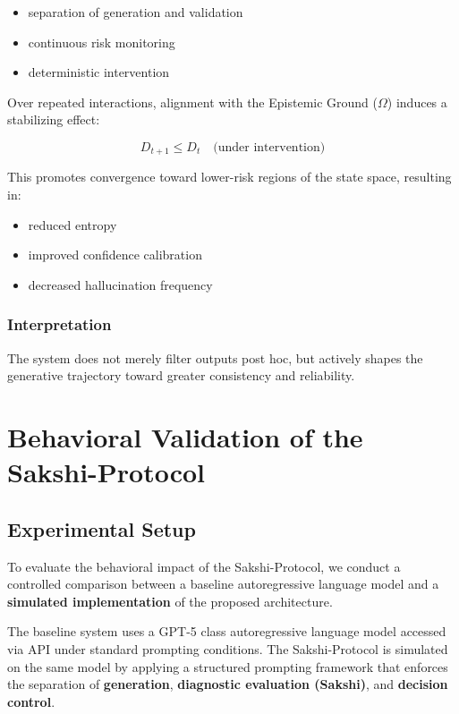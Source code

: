\documentclass[12pt,a4paper]{article}
\begin{document}
\begin{itemize}
\item separation of generation and validation
\item continuous risk monitoring
\item deterministic intervention
\end{itemize}

Over repeated interactions, alignment with the Epistemic Ground ($\Omega$) induces a stabilizing effect:

\[
D_{t+1} \leq D_t \quad \mbox{(under intervention)}
\]

This promotes convergence toward lower-risk regions of the state space, resulting in:

\begin{itemize}
\item reduced entropy
\item improved confidence calibration
\item decreased hallucination frequency
\end{itemize}

\subsubsection*{Interpretation}
The system does not merely filter outputs post hoc, but actively shapes the generative trajectory toward greater consistency and reliability.

\section{Behavioral Validation of the Sakshi-Protocol}

\subsection{Experimental Setup}

To evaluate the behavioral impact of the Sakshi-Protocol, we conduct a controlled comparison between a baseline autoregressive language model and a \textbf{simulated implementation} of the proposed architecture.

The baseline system uses a GPT-5 class autoregressive language model accessed via API under standard prompting conditions. The Sakshi-Protocol is simulated on the same model by applying a structured prompting framework that enforces the separation of \textbf{generation}, \textbf{diagnostic evaluation (Sakshi)}, and \textbf{decision control}.
\end{document}
